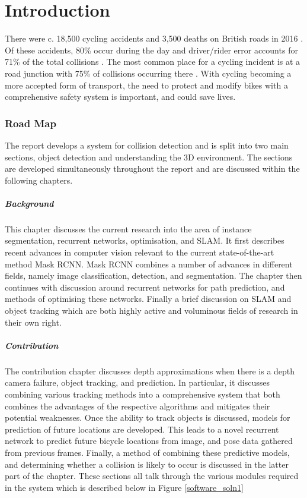\documentclass[11pt,twoside]{report}
\begin{document}
\chapter{Introduction}

There were c. 18,500 cycling accidents and 3,500 deaths on British roads in 2016 \cite{DFT_fig}. Of these accidents, 80\% occur during the day and driver/rider error accounts for 71\% of the total collisions \cite{DFT_fig2}. The most common place for a cycling incident is at a road junction with 75\% of collisions occurring there \cite{DFT_fig3}. With cycling becoming a more accepted form of transport, the need to protect and modify bikes with a comprehensive safety system is important, and could save lives.

\subsection{Road Map} The report develops a system for collision detection and is split into two main sections, object detection and understanding the 3D environment. The sections are developed simultaneously throughout the report and are discussed within the following chapters.

\paragraph{Background} This chapter discusses the current research into the area of instance segmentation, recurrent networks, optimisation, and SLAM. It first describes recent advances in computer vision relevant to the current state-of-the-art method Mask RCNN. Mask RCNN combines a number of advances in different fields, namely image classification, detection, and segmentation. The chapter then continues with discussion around recurrent networks for path prediction, and methods of optimising these networks. Finally a brief discussion on SLAM and object tracking which are both highly active and voluminous fields of research in their own right.

\paragraph{Contribution}
The contribution chapter discusses depth approximations when there is a depth camera failure, object tracking, and prediction. In particular, it discusses combining various tracking methods into a comprehensive system that both combines the advantages of the respective algorithms and mitigates their potential weaknesses. Once the ability to track objects is discussed, models for prediction of future locations are developed. This leads to a novel recurrent network to predict future bicycle locations from image, and pose data gathered from previous frames. Finally, a method of combining these predictive models, and determining whether a collision is likely to occur is discussed in the latter part of the chapter. These sections all talk through the various modules required in the system which is described below in Figure \ref{software_soln1}
\end{document}
